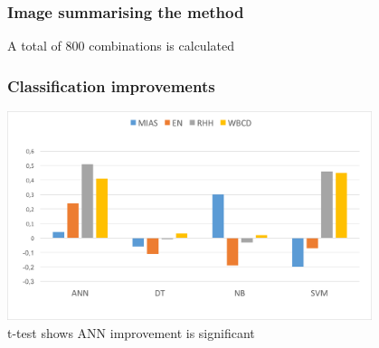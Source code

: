 \documentclass[aspectratio=1610]{beamer}
\begin{document}
\begin{frame}
  \frametitle{\hfill Image summarising the method}
  \begin{figure}[htp]
    \centering
  \end{figure}
  A total of 800 combinations is calculated
\end{frame}


\begin{frame}
  \frametitle{\hfill Classification improvements}

    \centering
    \includegraphics[width=0.8\textwidth]{images/acc_improv.png}
    \vspace{0.02\textheight}\\
    t-test shows ANN improvement is significant
\end{frame}
\end{document}
